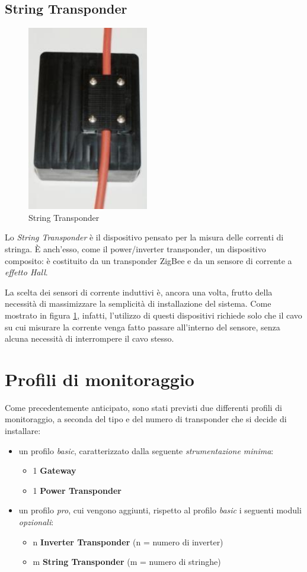 \subsection{String Transponder}
%
\begin{figure}[!h]
\centering
\includegraphics[width=150pt]{img/string-transponder.jpg}
\caption{String Transponder}
\label{string-transponder}
\end{figure}
%
Lo \emph{String Transponder} \`e il dispositivo pensato per la misura delle correnti 
di stringa. \`E anch'esso, come il power/inverter transponder, un dispositivo composito:
\`e costituito da un transponder ZigBee e da un sensore di corrente a \emph{effetto Hall}.
%

%
La scelta dei sensori di corrente induttivi \`e, ancora una volta, frutto della 
necessit\`a di massimizzare la semplicit\`a di installazione del sistema. 
%
Come mostrato in figura \ref{string-transponder}, infatti, l'utilizzo di questi dispositivi
richiede solo che il cavo su cui misurare la corrente venga fatto passare all'interno 
del sensore, senza alcuna necessit\`a di interrompere il cavo stesso.
%

%
\section{Profili di monitoraggio}
Come precedentemente anticipato, sono stati previsti due differenti profili di monitoraggio, 
a seconda del tipo e del numero di transponder che si decide di installare:
%
\begin{itemize}
\item un profilo \emph{basic}, caratterizzato dalla seguente \emph{strumentazione minima}:
      \begin{itemize}
      \item 1 \textbf{Gateway}
      \item 1 \textbf{Power Transponder}
      \end{itemize}
%
\item un profilo \emph{pro}, cui vengono aggiunti, rispetto al profilo \emph{basic} i seguenti 
      moduli \emph{opzionali}:
      \begin{itemize}
      \item n \textbf{Inverter Transponder} (n = numero di inverter)
      \item m \textbf{String Transponder} (m = numero di stringhe)
      \end{itemize}
\end{itemize}
%


